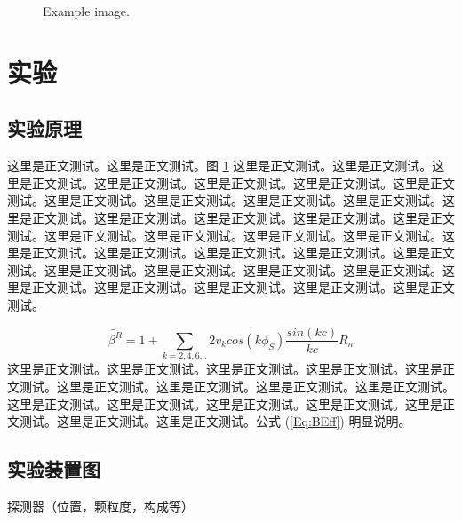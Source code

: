 \documentclass[prc,twocolumn,superscriptaddress,showkeys,showpacs,amssymb,amsmath,amsfonts,aps]{revtex4}
\begin{document}
\begin{figure}[h] %
\caption{Example image.}
\label{fig:speciation}
\end{figure}



\section{实验}%
\subsection{实验原理}
这里是正文测试。这里是正文测试。图 \ref{fig:speciation} 这里是正文测试。这里是正文测试。这里是正文测试。这里是正文测试。这里是正文测试。这里是正文测试。这里是正文测试。这里是正文测试。这里是正文测试。这里是正文测试。这里是正文测试。这里是正文测试。这里是正文测试。这里是正文测试。这里是正文测试。这里是正文测试。这里是正文测试。这里是正文测试。这里是正文测试。这里是正文测试。这里是正文测试。这里是正文测试。这里是正文测试。这里是正文测试。这里是正文测试。这里是正文测试。这里是正文测试。这里是正文测试。这里是正文测试。这里是正文测试。这里是正文测试。这里是正文测试。这里是正文测试。这里是正文测试。

\begin{equation}
  \tilde{\beta^{R}} = 1 + \sum_{k=2,4,6...} 2 v_k cos(k\phi_S) \frac{sin(kc)}{kc} R_n \label{Eq:BEff}
\end{equation}
这里是正文测试。这里是正文测试。这里是正文测试。这里是正文测试。这里是正文测试。这里是正文测试。这里是正文测试。这里是正文测试。这里是正文测试。这里是正文测试。这里是正文测试。这里是正文测试。这里是正文测试。这里是正文测试。这里是正文测试。这里是正文测试。公式 (\ref{Eq:BEff}) 明显说明。

\subsection{实验装置图}
探测器（位置，颗粒度，构成等）
\end{document}
